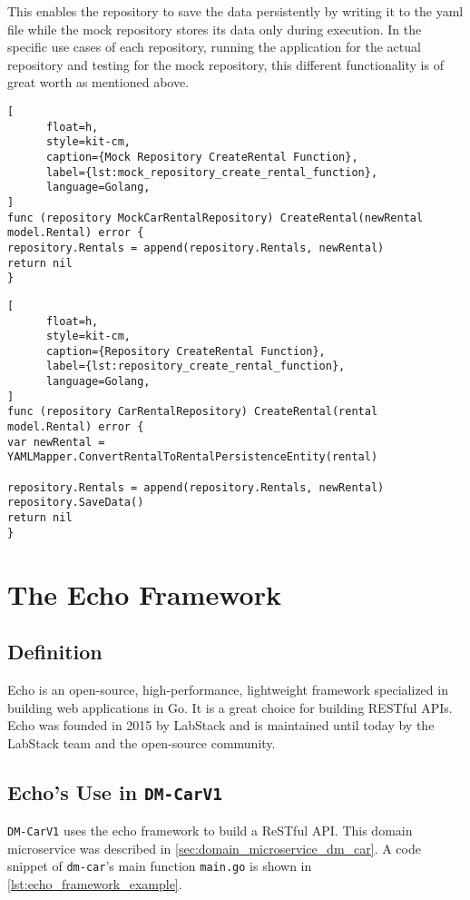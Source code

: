 This enables the repository to save the data persistently by writing it to the yaml file while the mock repository stores its data only during execution.
In the specific use cases of each repository, running the application for the actual repository and testing for the mock repository, this different functionality is of great worth as mentioned above.

\begin{lstlisting}[
      float=h,
      style=kit-cm,
      caption={Mock Repository CreateRental Function},
      label={lst:mock_repository_create_rental_function},
      language=Golang,
]
func (repository MockCarRentalRepository) CreateRental(newRental model.Rental) error {
repository.Rentals = append(repository.Rentals, newRental)
return nil
}
\end{lstlisting}

\begin{lstlisting}[
      float=h,
      style=kit-cm,
      caption={Repository CreateRental Function},
      label={lst:repository_create_rental_function},
      language=Golang,
]
func (repository CarRentalRepository) CreateRental(rental model.Rental) error {
var newRental = YAMLMapper.ConvertRentalToRentalPersistenceEntity(rental)

repository.Rentals = append(repository.Rentals, newRental)
repository.SaveData()
return nil
}
\end{lstlisting}

\section{The Echo Framework}
\label{sec:the_echo_framework}
\subsection{Definition}
Echo is an open-source, high-performance, lightweight framework specialized in building web applications in Go.
It is a great choice for building RESTful APIs.
Echo was founded in 2015 by LabStack and is maintained until today by the LabStack team and the open-source community.

\subsection{Echo's Use in \texttt{DM-CarV1}}
\texttt{DM-CarV1} uses the echo framework to build a ReSTful API.
This domain microservice was described in \autoref*{sec:domain_microservice_dm_car}.
A code snippet of \texttt{dm-car}'s main function \texttt{main.go} is shown in \autoref{lst:echo_framework_example}.

